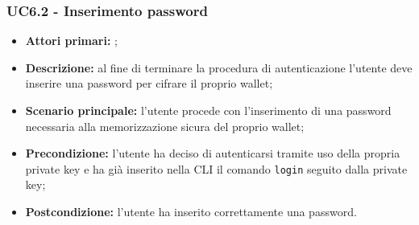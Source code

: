 \subsubsection{UC6.2 - Inserimento password}
\begin{itemize}
	\item \textbf{Attori primari:} \una{};
	\item \textbf{Descrizione:} al fine di terminare la procedura di autenticazione l’utente deve inserire una password per cifrare il proprio wallet;
	\item \textbf{Scenario principale:} l’utente procede con l’inserimento di 
	una password necessaria alla memorizzazione sicura del proprio wallet;  
	\item \textbf{Precondizione:} l’utente ha deciso di autenticarsi tramite uso della propria private key e ha già inserito nella CLI il comando \texttt{login} seguito dalla private key; 
	\item \textbf{Postcondizione:} l’utente ha inserito correttamente una password. 
\end{itemize}
